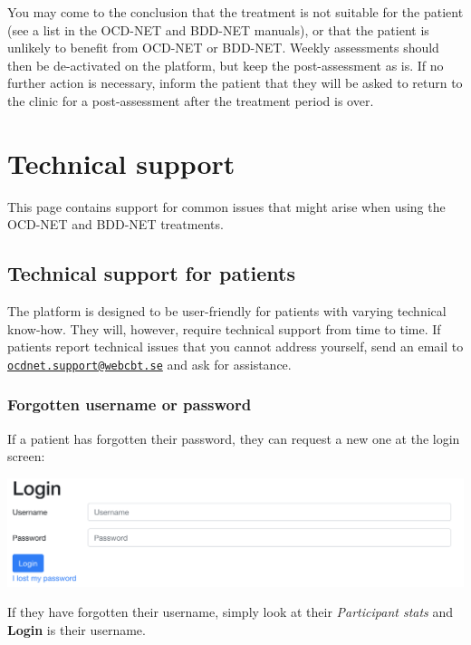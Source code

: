 \documentclass[]{book}
\theoremstyle{definition}
\theoremstyle{definition}
\theoremstyle{definition}
\theoremstyle{remark}
\begin{document}
You may come to the conclusion that the treatment is not suitable for
the patient (see a list in the OCD-NET and BDD-NET manuals), or that the
patient is unlikely to benefit from OCD-NET or BDD-NET. Weekly
assessments should then be de-activated on the platform, but keep the
post-assessment as is. If no further action is necessary, inform the
patient that they will be asked to return to the clinic for a
post-assessment after the treatment period is over.

\hypertarget{technical-support}{%
\chapter{Technical support}\label{technical-support}}

This page contains support for common issues that might arise when using
the OCD-NET and BDD-NET treatments.

\hypertarget{technical-support-for-patients}{%
\section{Technical support for
patients}\label{technical-support-for-patients}}

The platform is designed to be user-friendly for patients with varying
technical know-how. They will, however, require technical support from
time to time. If patients report technical issues that you cannot
address yourself, send an email to
\href{mailto:ocdnet.support@webcbt.se}{\nolinkurl{ocdnet.support@webcbt.se}}
and ask for assistance.

\hypertarget{forgotten-username-or-password}{%
\subsection{Forgotten username or
password}\label{forgotten-username-or-password}}

If a patient has forgotten their password, they can request a new one at
the login screen:

\includegraphics{images/patient-login.png}

If they have forgotten their username, simply look at their
\emph{Participant stats} and \textbf{Login} is their username.
\end{document}
